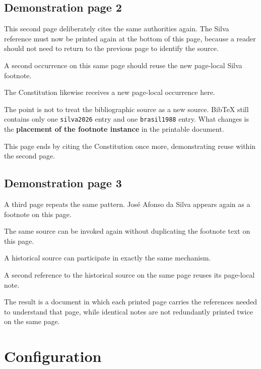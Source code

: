 \documentclass[
  letterpaper,
  DIV=11,
  numbers=noendperiod]{scrartcl}
\begin{document}
\newpage{}

\subsection{Demonstration page 2}\label{demonstration-page-2}

This second page deliberately cites the same authorities again. The
Silva reference must now be printed again at the bottom of this page,
because a reader should not need to return to the previous page to
identify the source.\rfnnotea

A second occurrence on this same page should reuse the new page-local
Silva footnote.\rfnnotea

The Constitution likewise receives a new page-local occurrence
here.\rfnnoteb

The point is not to treat the bibliographic source as a new source.
BibTeX still contains only one \texttt{silva2026} entry and one
\texttt{brasil1988} entry. What changes is the \textbf{placement of the
footnote instance} in the printable document.

This page ends by citing the Constitution once more, demonstrating reuse
within the second page.\rfnnoteb

\newpage{}

\subsection{Demonstration page 3}\label{demonstration-page-3}

A third page repeats the same pattern. José Afonso da Silva appears
again as a footnote on this page.\rfnnotea

The same source can be invoked again without duplicating the footnote
text on this page.\rfnnotea

A historical source can participate in exactly the same
mechanism.\rfnnotec

A second reference to the historical source on the same page reuses its
page-local note.\rfnnotec

The result is a document in which each printed page carries the
references needed to understand that page, while identical notes are not
redundantly printed twice on the same page.

\section{Configuration}\label{configuration}
\end{document}
